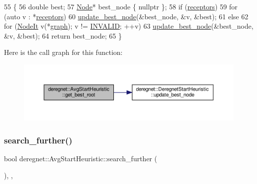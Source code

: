 \begin{DoxyCode}
55                                        \{
56     \textcolor{keywordtype}{double} best;
57     \hyperlink{namespacederegnet_a744bad34f2de9856d36715a445f027f3}{Node}* best\_node \{ \textcolor{keyword}{nullptr} \};
58     \textcolor{keywordflow}{if} (\hyperlink{classderegnet_1_1DeregnetStartHeuristic_ab80c046ff2b7c64086fceb84987b3e50}{receptors})
59         \textcolor{keywordflow}{for} (\textcolor{keyword}{auto} v : *\hyperlink{classderegnet_1_1DeregnetStartHeuristic_ab80c046ff2b7c64086fceb84987b3e50}{receptors})
60             \hyperlink{classderegnet_1_1DeregnetStartHeuristic_a50179ff9db4d416b93ff41d1dcee1358}{update\_best\_node}(&best\_node, &v, &best);
61     \textcolor{keywordflow}{else}
62         \textcolor{keywordflow}{for} (\hyperlink{namespacederegnet_ac34314e1b5f456fc6d1bb9d96316de4a}{NodeIt} v(*\hyperlink{classderegnet_1_1DeregnetStartHeuristic_a4da8e53fc7c0fa3dbe0e3ef07296d75e}{graph}); v != \hyperlink{usinglemon_8hpp_adf770fe2eec438e3758ffe905dbae208}{INVALID}; ++v)
63             \hyperlink{classderegnet_1_1DeregnetStartHeuristic_a50179ff9db4d416b93ff41d1dcee1358}{update\_best\_node}(&best\_node, &v, &best);
64     \textcolor{keywordflow}{return} best\_node;
65 \}
\end{DoxyCode}
Here is the call graph for this function\+:\nopagebreak
\begin{figure}[H]
\begin{center}
\leavevmode
\includegraphics[width=350pt]{classderegnet_1_1AvgStartHeuristic_ac13190b98b5611ad231fe3d9447431fb_cgraph}
\end{center}
\end{figure}
\mbox{\label{classderegnet_1_1AvgStartHeuristic_a6fcfd578c66c01240d3484513a34bef6}} 
\subsubsection{\texorpdfstring{search\+\_\+further()}{search\_further()}}
{\footnotesize\ttfamily bool deregnet\+::\+Avg\+Start\+Heuristic\+::search\+\_\+further (\begin{DoxyParamCaption}{ }\end{DoxyParamCaption})\hspace{0.3cm}{\ttfamily [override]}, {\ttfamily [private]}, {\ttfamily [virtual]}}



